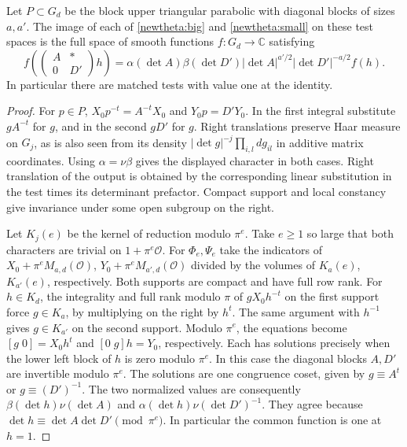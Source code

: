 \begin{proposition}\label{newtheta:split}
Let \(P\subset G_d\) be the block upper triangular parabolic with
diagonal blocks of sizes \(a,a'\). The image of each of
\eqref{newtheta:big} and \eqref{newtheta:small} on these test spaces is
the full space of smooth functions \(f:G_d\to\mathbb C\) satisfying
\[
 f\left(\begin{pmatrix}A&*\\0&D'\end{pmatrix}h\right)
 =\alpha(\det A)\beta(\det D')|\det A|^{a'/2}
             |\det D'|^{-a/2}f(h).
\]
In particular there are matched tests with value one at the identity.
\end{proposition}
\begin{proof}
For \(p\in P\), \(X_0p^{-t}=A^{-t}X_0\) and \(Y_0p=D'Y_0\).
In the first integral substitute \(gA^{-t}\) for \(g\), and in the
second \(gD'\) for \(g\). Right translations preserve Haar measure on
\(G_j\), as is also seen from its density
\(|\det g|^{-j}\prod_{i,l}dg_{il}\) in additive matrix coordinates.
Using \(\alpha=\nu\beta\) gives the displayed character in both cases.
Right translation of the output is obtained by the corresponding linear
substitution in the test times its determinant prefactor. Compact support
and local constancy give invariance under some open subgroup on the right.

Let \(K_j(e)\) be the kernel of reduction modulo \(\pi^e\). Take
\(e\ge1\) so large that both characters are trivial on
\(1+\pi^e\mathcal O\). For \(\Phi_e,\Psi_e\) take the indicators of
\(X_0+\pi^eM_{a,d}(\mathcal O)\), \(Y_0+\pi^eM_{a',d}(\mathcal O)\)
divided by the volumes of \(K_a(e)\), \(K_{a'}(e)\), respectively.
Both supports are compact and have full row rank. For \(h\in K_d\),
the integrality and full rank modulo \(\pi\) of \(gX_0h^{-t}\) on
the first support force \(g\in K_a\), by multiplying on the right by
\(h^t\). The same argument with \(h^{-1}\) gives \(g\in K_{a'}\)
on the second support. Modulo \(\pi^e\), the equations become
\([g\;0]=X_0h^t\) and \([0\;g]h=Y_0\), respectively.
Each has solutions precisely when the lower left block of \(h\)
is zero modulo \(\pi^e\). In this case the diagonal blocks \(A,D'\)
are invertible modulo \(\pi^e\). The solutions are one congruence
coset, given by \(g\equiv A^t\) or \(g\equiv (D')^{-1}\).
The two normalized values are consequently
\(\beta(\det h)\nu(\det A)\) and
\(\alpha(\det h)\nu(\det D')^{-1}\). They agree because
\(\det h\equiv\det A\det D'\pmod{\pi^e}\).
In particular the common function is one at \(h=1\).


\end{proof}
